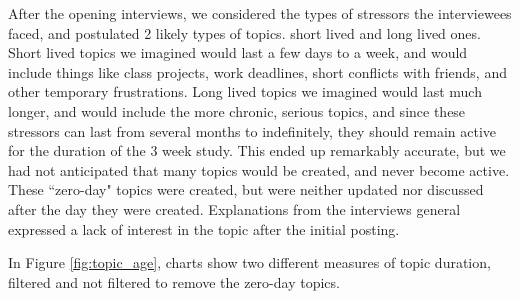   After the opening interviews, we considered the types of stressors the
  interviewees faced, and postulated 2 likely types of topics.
  short lived and long lived ones.
  Short lived topics we imagined would last a few days to a week,
  and would include things like class projects,
  work deadlines, short conflicts with friends, and other temporary frustrations.
  Long lived topics we imagined would last much longer,
  and would include the more chronic, serious topics,
  and since these stressors can last from several months to indefinitely,
  they should remain active for the duration of the 3 week study.
  This ended up remarkably accurate,
  but we had not anticipated that many topics would be created,
  and never become active.
  These ``zero-day" topics were created,
  but were neither updated nor discussed after the day they were created.
  Explanations from the interviews general expressed a lack of interest
  in the topic after the initial posting.

  In Figure \ref{fig:topic_age}, charts show two different measures of 
  topic duration, filtered and not filtered to remove the zero-day topics.

